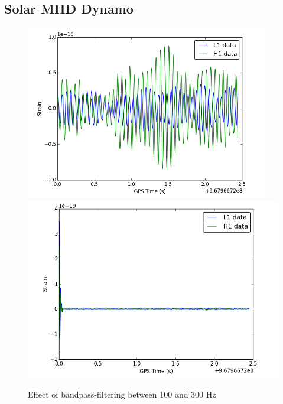 \subsection{Solar MHD Dynamo}
\begin{figure}
\begin{minipage}[c][23cm]{0.9\textwidth}
  \caption{Effect of bandpass-filtering between 100 and 300 Hz}
  \centering
  \includegraphics[width=0.95\textwidth]{L1_H1}
  \label{figa}
   \includegraphics[width=\textwidth]{bandpass}
  \label{figb}
\end{minipage}
\end{figure}

